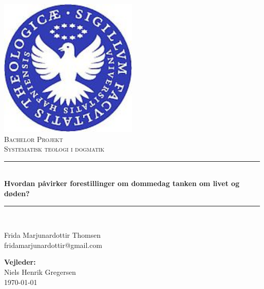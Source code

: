 \begin{titlepage}
\newcommand{\HRule}{\rule{\linewidth}{0.5mm}} %

\center %
 

\includegraphics[width=0.5\textwidth]{logo.jpg}\\[1cm] %

\vspace{1 cm}
\textsc{\LARGE Bachelor Projekt} \\[0.4cm] %
\textsc{\large Systematisk teologi i dogmatik} \\
\vspace{1 cm}
\HRule \\[1.0cm]
{ \LARGE \textbf{Hvordan påvirker forestillinger om dommedag tanken om livet og døden?} \small \vspace{0.4cm}}\\ %
\HRule \\[1.0cm]
 
\center

\LARGE Frida Marjunardottir Thomsen \\
\vspace{0.2 cm}
\small fridamarjunardottir@gmail.com \\

\vspace{0.5 cm}

\large \textbf{Vejleder:} \\
\large Niels Henrik Gregersen\\
\vspace{0.4 cm}
{\large \today}\\[3cm] %
\end{titlepage}


